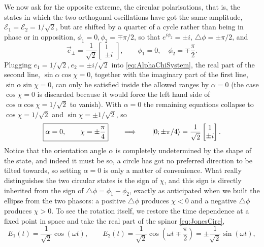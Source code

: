            We now ask for the opposite extreme, the circular polarisations, that is, the states in which the two orthogonal oscillations have got the same amplitude, $\mathcal{E}_1=\mathcal{E}_2=1/\sqrt2$, but are shifted by a quarter of a cycle rather than being in phase or in opposition, $\phi_1=0,\phi_2=\mp\pi/2$, so that $e^{i\phi_2}=\pm i$, $\triangle\phi=\pm\pi/2$, and
            \begin{equation}\label{eq:JonesCirc}
                \vec{e}_{\pm} = \frac{1}{\sqrt2}\begin{bmatrix}1\\ \pm i\end{bmatrix}, \qquad \phi_1=0,\quad\phi_2=\mp\frac{\pi}{2}.
            \end{equation}
            Plugging $e_1=1/\sqrt2,e_2=\pm i/\sqrt2$ into \ref{eq:AlphaChiSystem}, the real part of the second line, $\sin\alpha\cos\chi=0$, together with the imaginary part of the first line, $\sin\alpha\sin\chi=0$, can only be satisfied inside the allowed ranges by $\alpha=0$ (the case $\cos\chi=0$ is discarded because it would force the left hand side of $\cos\alpha\cos\chi=1/\sqrt2$ to vanish). With $\alpha=0$ the remaining equations collapse to $\cos\chi=1/\sqrt2$ and $\sin\chi=\pm1/\sqrt2$, so
            \begin{equation}\label{eq:CircAngles}
                \boxed{\alpha=0,\qquad \chi=\pm\frac{\pi}{4}} \qquad\Longrightarrow\qquad \ket{0;\pm\pi/4}=\frac{1}{\sqrt2}\begin{bmatrix}1\\\pm i\end{bmatrix}.
            \end{equation}
            Notice that the orientation angle $\alpha$ is completely undetermined by the shape of the state, and indeed it must be so, a circle has got no preferred direction to be tilted towards, so setting $\alpha=0$ is only a matter of convenience. What really distinguishes the two circular states is the sign of $\chi$, and this sign is directly inherited from the sign of $\triangle\phi=\phi_1-\phi_2$, exactly as anticipated when we built the ellipse from the two phasors: a positive $\triangle\phi$ produces $\chi<0$ and a negative $\triangle\phi$ produces $\chi>0$. To see the rotation itself, we restore the time dependence at a fixed point in space and take the real part of the spinor \ref{eq:JonesCirc},
            \begin{equation*}
                E_1(t) = \frac{1}{\sqrt2}\cos(\omega t), \qquad E_2(t) = \frac{1}{\sqrt2}\cos\left(\omega t \mp \frac{\pi}{2}\right) = \pm\frac{1}{\sqrt2}\sin(\omega t),
            \end{equation*}
